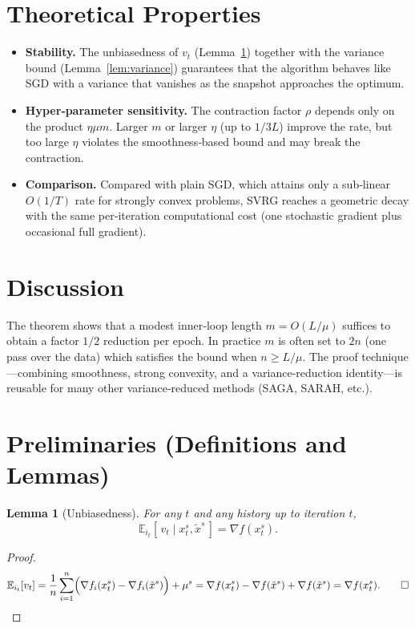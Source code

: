 \documentclass{article}
\newtheorem{lemma}{Lemma}
\begin{document}
\section*{Theoretical Properties}
\begin{itemize}
\item \textbf{Stability.} The unbiasedness of $v_t$ (Lemma~\ref{lem:unbiased}) together with the variance bound (Lemma~\ref{lem:variance}) guarantees that the algorithm behaves like SGD with a variance that vanishes as the snapshot approaches the optimum.
\item \textbf{Hyper‑parameter sensitivity.} The contraction factor $\rho$ depends only on the product $\eta\mu m$. Larger $m$ or larger $\eta$ (up to $1/3L$) improve the rate, but too large $\eta$ violates the smoothness‑based bound and may break the contraction.
\item \textbf{Comparison.} Compared with plain SGD, which attains only a sub‑linear $O(1/T)$ rate for strongly convex problems, SVRG reaches a geometric decay with the same per‑iteration computational cost (one stochastic gradient plus occasional full gradient).
\end{itemize}

\section*{Discussion}
The theorem shows that a modest inner‑loop length $m=O(L/\mu)$ suffices to obtain a factor $1/2$ reduction per epoch. In practice $m$ is often set to $2n$ (one pass over the data) which satisfies the bound when $n\ge L/\mu$. The proof technique—combining smoothness, strong convexity, and a variance‑reduction identity—is reusable for many other variance‑reduced methods (SAGA, SARAH, etc.).

\newpage
\section*{Preliminaries (Definitions and Lemmas)}
\begin{lemma}[Unbiasedness]
\label{lem:unbiased}
For any $t$ and any history up to iteration $t$,
\[
\mathbb{E}_{i_t}[\,v_t\mid x^{s}_t,\tilde{x}^{s}\,]=\nabla f(x^{s}_t).
\]
\end{lemma}
\begin{proof}
\[
\mathbb{E}_{i_t}[v_t]
=\frac1n\sum_{i=1}^n\Bigl(\nabla f_i(x^{s}_t)-\nabla f_i(\tilde{x}^{s})\Bigr)+\mu^{s}
=\nabla f(x^{s}_t)-\nabla f(\tilde{x}^{s})+\nabla f(\tilde{x}^{s})
=\nabla f(x^{s}_t).
\tag*{$\square$}
\]
\end{proof}
\end{document}

